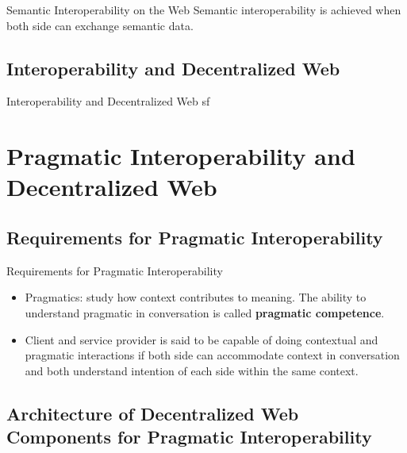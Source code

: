 \documentclass[10pt]{beamer}
\begin{document}
    \begin{frame}[fragile]{Semantic Interoperability on the Web}
      Semantic interoperability is achieved when both side can exchange semantic data. 
    \end{frame}

  \subsection{Interoperability and Decentralized Web}

    \begin{frame}[fragile]{Interoperability and Decentralized Web}
      sf
    \end{frame}

\section{Pragmatic Interoperability and Decentralized Web}

  \subsection{Requirements for Pragmatic Interoperability}

    \begin{frame}[fragile]{Requirements for Pragmatic Interoperability}

      \begin{itemize}
        \item Pragmatics: study how context contributes to meaning. The ability to understand pragmatic in conversation is called \textbf{pragmatic competence}.
        \item Client and service provider is said to be capable of doing contextual and pragmatic interactions if both side can accommodate context in conversation and both understand intention of each side within the same context.
      \end{itemize}

    \end{frame}

  \subsection{Architecture of Decentralized Web Components for Pragmatic Interoperability}
\end{document}

